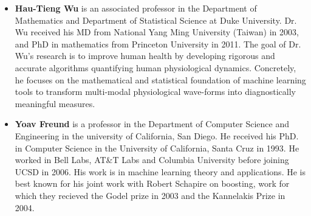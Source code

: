 \begin{itemize}

\item {\bf Hau-Tieng Wu} is an associated professor in the Department
  of Mathematics and Department of Statistical Science at Duke
  University. Dr. Wu received his MD from National Yang Ming
  University (Taiwan) in 2003, and PhD in mathematics from Princeton
  University in 2011. The goal of Dr. Wu's research is to improve
  human health by developing rigorous and accurate algorithms
  quantifying human physiological dynamics.  Concretely, he focuses on
  the mathematical and statistical foundation of machine learning
  tools to transform multi-modal physiological wave-forms into
  diagnostically meaningful measures.
  
\item {\bf Yoav Freund} is a professor in the Department of Computer
  Science and Engineering in the university of California, San
  Diego. He received his PhD. in Computer Science in the University of
  California, Santa Cruz in 1993.  He worked in Bell Labs, AT\&T Labs
  and Columbia University before joining UCSD in 2006. His work is in
  machine learning theory and applications. He is best known for his
  joint work with Robert Schapire on boosting, work for which they recieved
  the Godel prize in 2003 and the Kannelakis Prize in 2004.
  
\end{itemize}